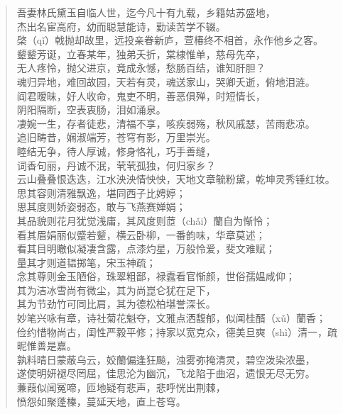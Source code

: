 \documentclass[12pt,oneside]{book}
\newenvironment{shici}{%
\begin{verse}%
\centering\large\hspace{12pt}}%
{\end{verse}}
\begin{document}
\begin{shici}
吾妻林氏黛玉自临人世，迄今凡十有九载，乡籍姑苏盛地，\\
杰出名宦高府，幼而聪慧能诗，勤读苦学不辍。\\
棨（qǐ）戟抛却故里，远投亲眷新庐，萱椿终不相首，永作他乡之客。\\
颦颦芳诞，立春某年，独弟夭折，棠棣惟单，慈母先卒，\\
无人疼怜，抛父进京，竟成永憾，愁肠百结，谁知肝胆？\\
魂归异地，难回故园，天若有灵，魂送家山，哭卿夭逝，俯地泪涟。\\
阎君暧昧，好人收命，鬼吏不明，善恶俱殚，时短情长，\\
阴阳隔断，空表衷肠，泪如涌泉。\\
凄婉一生，存者徒悲，清福不享，咳疾弱殇，秋风戚瑟，苦雨悲凉。\\
追旧畴昔，娴淑端芳，苍穹有影，万里崇光。\\
睦结无争，待人厚诚，修身恪礼，巧手善缝，\\
词香句丽，丹诚不泯，茕茕孤独，何归家乡？\\
云山叠叠恨迭迭，江水泱泱情怏怏，天地文章毓粉黛，乾坤灵秀锺红妆。\\
思其容则清雅飘逸，堪同西子比娉婷；\\
思其度则娇姿弱态，敢与飞燕赛婵娟；\\
其品貌则花月犹觉浅庸，其风度则茝（chǎi）蘭自为惭怜；\\
看其眉娟丽似蹙若颦，横云卧柳，一番韵味，华章莫述；\\
看其目明瞮似凝凄含露，点漆灼星，万般怜爱，斐文难赋；\\
量其才则道韫掷笔，宋玉神疏；\\
念其尊则金玉陋俗，珠翠粗鄙，禄蠹看官惭颜，世俗孺媪咸仰；\\
其为洁冰雪尚有微尘，其为尚崑仑犹在足下，\\
其为节劲竹可同比肩，其为德松柏堪誉深长。\\
妙笔兴咏有章，诗社菊花魁夺，文雅点洒馥郁，似闻桂醑（xǔ）蘭香；\\
俭约惜物尚古，闺性严毅平修；持家以宽克众，德美旦奭（shì）清一，疏昵惟善是嘉。\\
孰料晴日蒙蔽乌云，姣蘭偏逢狂飈，浊雾弥掩清灵，碧空泼染浓墨，\\
遂使明妍褪尽罔屈，佳思沦为幽沉，飞龙陷于曲沼，遗恨无尽无穷。\\
蒹葭似闻冤啼，匝地疑有悲声，悲呼恍出荆棘，\\
愤怨如聚蓬榛，蔓延天地，直上苍穹。\\

\end{shici}
\end{document}
